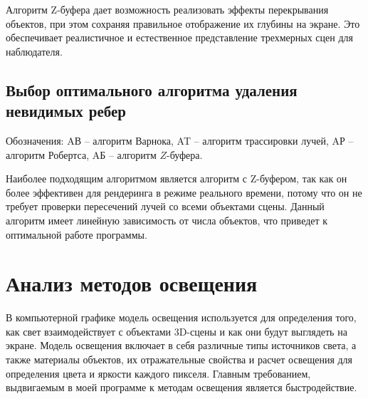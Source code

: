 Алгоритм Z-буфера дает возможность реализовать эффекты 
перекрывания объектов, при этом сохраняя правильное отображение их 
глубины на экране\cite{rodgers}. Это обеспечивает реалистичное и естественное 
представление трехмерных сцен для наблюдателя.

\subsection{Выбор оптимального алгоритма удаления невидимых ребер}

	 \begin{table}[h!]
	\caption{Сравнение алгоритмов удаления ребер и поверхностей}
	\centering
	\label{table:Compare}
	\end{table}
    \par Обозначения: AВ -- алгоритм Варнока, AT -- алгоритм трассировки лучей, AР -- алгоритм Робертса, AБ -- алгоритм $Z$-буфера.

Наиболее подходящим алгоритмом является алгоритм с Z-буфером, так как он более эффективен для рендеринга в режиме реального времени, потому что он не требует проверки пересечений лучей со всеми объектами сцены. Данный алгоритм имеет линейную зависимость от числа объектов, что приведет к оптимальной
работе программы. 

\section{Анализ методов освещения}
В компьютерной графике модель освещения используется для 
определения того, как свет взаимодействует с объектами 3D-сцены и как они 
будут выглядеть на экране. Модель освещения включает в себя различные типы 
источников света, а также материалы объектов, их отражательные свойства и 
расчет освещения для определения цвета и яркости каждого пикселя. Главным
требованием, выдвигаемым в моей программе к методам освещения является быстродействие.

